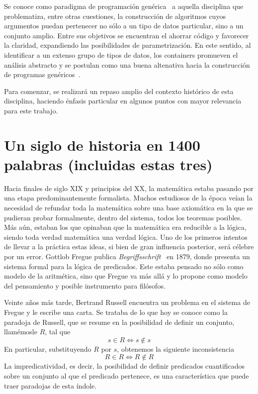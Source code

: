 Se conoce como paradigma de programación genérica~\cite{generic} a aquella disciplina que problematiza, entre otras cuestiones, la construcción de algoritmos cuyos argumentos puedan pertenecer no sólo a un tipo de datos particular, sino a un conjunto amplio. Entre sus objetivos se encuentran el ahorrar código y favorecer la claridad, expandiendo las posibilidades de parametrización. En este sentido, al identificar a un extenso grupo de tipos de datos, los containers promueven el análisis abstracto y se postulan como una buena altenativa hacia la construcción de programas genéricos~\cite{alti:2007}.

Para comenzar, se realizará un repaso amplio del contexto histórico de esta disciplina, haciendo énfasis particular en algunos puntos con mayor relevancia para este trabajo.

\section*{Un siglo de historia en 1400 palabras (incluidas estas tres)}%

Hacia finales de siglo XIX y principios del XX, la matemática estaba pasando por una etapa predominantemente formalista. Muchos estudiosos de la época veían la necesidad de refundar toda la matemática sobre una base axiomática en la que se pudieran probar formalmente, dentro del sistema, todos los teoremas posibles. Más aún, estaban los que opinaban que la matemática era reducible a la lógica, siendo toda verdad matemática una verdad lógica. Uno de los primeros intentos de llevar a la práctica estas ideas, si bien de gran influencia posterior, será célebre por un error. Gottlob Fregue publica {\it Begriffsschrift}~ en 1879, donde presenta un sistema formal para la lógica de predicados. Este estaba pensado no sólo como modelo de la aritmética, sino que Fregue va más allá y lo propone como modelo del pensamiento y posible instrumento para filósofos.

Veinte años más tarde, Bertrand Russell encuentra un problema en el sistema de Fregue y le escribe una carta. Se trataba de lo que hoy se conoce como la paradoja de Russell, que se resume en la posibilidad de definir un conjunto, llamémosle $R$, tal que $$s \in R \Leftrightarrow s \notin s$$ En particular, substituyendo $R$ por $s$, obtenemos la siguiente inconsistencia $$R \in R \Leftrightarrow R \notin R$$
La impredicatividad, es decir, la posibilidad de definir predicados cuantificados sobre un conjunto al que el predicado pertenece, es una característica que puede traer paradojas de esta índole.

